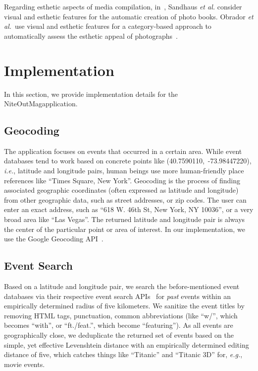\documentclass{acm_proc_article-sp}
\let\oldemph\emph
\renewcommand{\emph}[1]{\oldemph{\fontsize{9}{9}\selectfont #1}}
\begin{document}
Regarding esthetic aspects of media compilation,
in~\cite{Sandhaus2011}, Sandhaus \emph{et al.} consider visual and
esthetic features for the automatic creation of photo books.
Obrador \emph{et al.}\ use visual and esthetic features
for a category-based approach to automatically assess
the esthetic appeal of photographs~\cite{Obrador2012}.


\section{Implementation}
In this section, we provide implementation details for the
NiteOutMag\texttrademark application.

\subsection{Geocoding}
The application focuses on events that occurred in a certain area.
While event databases tend to work based on concrete points like
\mbox{(40.7590110, -73.98447220)}, \emph{i.e.},
latitude and longitude pairs, human beings use more human-friendly place references
like ``Times Square, New York''.
Geocoding is the process of finding associated geographic coordinates
(often expressed as latitude and longitude) from other geographic data,
such as street addresses, or zip codes.
The user can enter an exact address, such as
``618 W. 46th St, New York, NY 10036'', or a very broad area like ``Las Vegas''.
The returned latitude and longitude pair is always the center
of the particular point or area of interest.
In our implementation, we use the Google Geocoding API~\cite{Geocoding2012}.

\subsection{Event Search}
Based on a latitude and longitude pair, we search the before-mentioned
event databases via their respective event search
APIs~\cite{Eventful2012,Foursquare2012,GooglePlaces2012,Upcoming2012}
for \emph{past} events within an empirically determined radius of five kilometers.
We sanitize the event titles by removing HTML tags, punctuation,
common abbreviations (like ``w/'', which becomes ``with'', or ``ft./feat.'',
which become ``featuring'').
As all events are geographically close, we deduplicate the returned set of events
based on the simple, yet effective Levenshtein distance
with an empirically determined editing distance of five,
which catches things like ``Titanic'' and ``Titanic 3D'' for, \emph{e.g.}, movie events.
\end{document}
